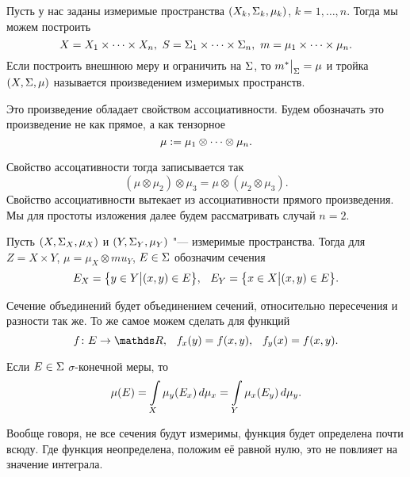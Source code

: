 \begin{Def}
  Пусть у нас заданы измеримые пространства $(X_k,\Sigma_k,\mu_k)$, $k=1,\dots,n$. Тогда мы можем построить 
\[
  X = X_1\times\dots\times X_n,\  S = \Sigma_1\times\dots\times \Sigma_n,\ m=\mu_1\times\dots\times \mu_n.
\]
Если построить внешнюю меру и ограничить на $\Sigma$, то $m^*\big|_\Sigma = \mu$ и тройка $(X,\Sigma,\mu)$ называется произведением измеримых пространств.
\end{Def}

Это произведение обладает свойством ассоциативности. Будем обозначать это произведение не как прямое, а как тензорное
\[
  \mu := \mu_1\otimes\dots\otimes\mu_n.
\]

Свойство ассоцативности тогда записывается так
\[
  (\mu\otimes\mu_2)\otimes \mu_3 = \mu\otimes(\mu_2\otimes \mu_3).
\]
Свойство ассоциативности вытекает из ассоциативности прямого произведения. Мы для простоты изложения далее будем рассматривать случай $n=2$.

Пусть $(X,\Sigma_X,\mu_X)$ и $(Y,\Sigma_Y,\mu_Y)$ "--- измеримые пространства. Тогда для $Z = X\times Y$, $\mu = \mu_X\otimes mu_Y$, $E\in\Sigma$ обозначим сечения
\[
  E_X = \big\{y\in Y\big|(x,y)\in E\big\},\hskip .75em plus.1em minus.08em\relax E_Y = \big\{x\in X\big|(x,y)\in E\big\}.
\]

Сечение объединений будет объединением сечений, относительно пересечения и разности так же. То же самое можем сделать для функций
\[
  f\colon E\to\R,\pau f_x(y) = f(x,y),\pau f_y(x) = f(x,y).
\]

\begin{The}
  Если $E\in \Sigma$ $\sigma$-конечной меры, то 
  \[
    \mu(E) = \int\limits_{X}\mu_y(E_x)\,d\mu_x = \int\limits_{Y}\mu_x(E_y)\,d\mu_y.
  \]
\end{The}

Вообще говоря, не все сечения будут измеримы, функция будет определена почти всюду. Где функция неопределена, положим её равной нулю, это не повлияет на значение интеграла.

